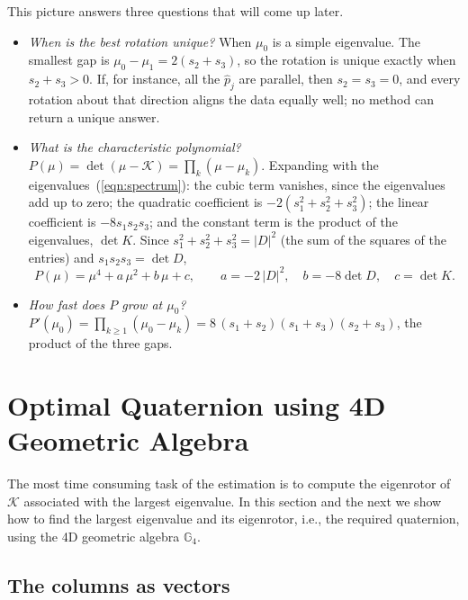\documentclass{birkjour}
\theoremstyle{definition}
\theoremstyle{remark}
\numberwithin{equation}{section}
\newcommand{\K}{\mathcal{K}}
\newcommand{\Ge}{\mathbb{G}}
\begin{document}
This picture answers three questions that will come up later.
\begin{itemize}
\item \emph{When is the best rotation unique?} When $\mu_0$ is a simple eigenvalue. The smallest gap is $\mu_0 - \mu_1 = 2 (s_2 + s_3)$, so the rotation is unique exactly when $s_2 + s_3 > 0$. If, for instance, all the $\hat p_j$ are parallel, then $s_2 = s_3 = 0$, and every rotation about that direction aligns the data equally well; no method can return a unique answer.
\item \emph{What is the characteristic polynomial?} $P(\mu) = \det(\mu - \K) = \prod_k (\mu - \mu_k)$. Expanding with the eigenvalues~(\ref{eqn:spectrum}): the cubic term vanishes, since the eigenvalues add up to zero; the quadratic coefficient is $-2 (s_1^2 + s_2^2 + s_3^2)$; the linear coefficient is $-8 s_1 s_2 s_3$; and the constant term is the product of the eigenvalues, $\det K$. Since $s_1^2 + s_2^2 + s_3^2 = |D|^2$ (the sum of the squares of the entries) and $s_1 s_2 s_3 = \det D$,
\begin{equation}
\label{eqn:charpoly}
P(\mu) = \mu^4 + a\, \mu^2 + b\, \mu + c, \qquad a = -2\, |D|^2, \quad b = -8 \det D, \quad c = \det K.
\end{equation}
\item \emph{How fast does $P$ grow at $\mu_0$?} $P'(\mu_0) = \prod_{k \geq 1} (\mu_0 - \mu_k) = 8\, (s_1 + s_2)(s_1 + s_3)(s_2 + s_3)$, the product of the three gaps.
\end{itemize}

\section{Optimal Quaternion using 4D Geometric Algebra}
\label{section:eigenvalue}

The most time consuming task of the estimation is to compute the eigenrotor of $\K$ associated with the largest eigenvalue. In this section and the next we show how to find the largest eigenvalue and its eigenrotor, i.e., the required quaternion, using the 4D geometric algebra $\Ge_4$.

\subsection{The columns as vectors}
\end{document}
